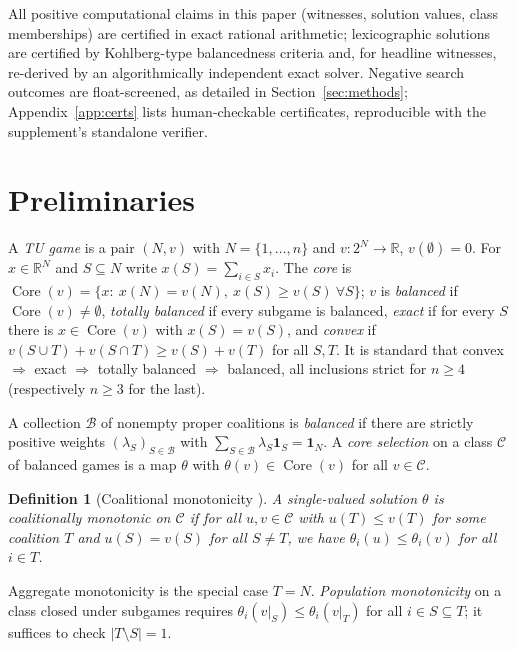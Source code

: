 \documentclass[11pt]{article}
\newtheorem{definition}[theorem]{Definition}
\newcommand{\R}{\mathbb{R}}
\newcommand{\core}{\operatorname{Core}}
\begin{document}
All positive computational claims in this paper (witnesses, solution
values, class memberships) are certified in exact rational arithmetic;
lexicographic solutions are certified by Kohlberg-type balancedness criteria
and, for headline witnesses, re-derived by an algorithmically independent
exact solver. Negative search outcomes are float-screened, as detailed in
Section~\ref{sec:methods}; Appendix~\ref{app:certs} lists human-checkable
certificates, reproducible with the supplement's standalone verifier.

\section{Preliminaries}\label{sec:prelim}

A \emph{TU game} is a pair $(N,v)$ with $N=\{1,\dots,n\}$ and
$v:2^N\to\R$, $v(\emptyset)=0$. For $x\in\R^N$ and $S\subseteq N$ write
$x(S)=\sum_{i\in S}x_i$. The \emph{core} is
$\core(v)=\{x:\ x(N)=v(N),\ x(S)\ge v(S)\ \forall S\}$; $v$ is
\emph{balanced} if $\core(v)\neq\emptyset$, \emph{totally balanced} if every
subgame is balanced, \emph{exact} \citep{Schmeidler72} if for every $S$ there is
$x\in\core(v)$ with $x(S)=v(S)$, and \emph{convex} if
$v(S\cup T)+v(S\cap T)\ge v(S)+v(T)$ for all $S,T$. It is standard that
convex $\Rightarrow$ exact $\Rightarrow$ totally balanced $\Rightarrow$
balanced, all inclusions strict for $n\ge 4$ (respectively $n\ge 3$ for the
last).

A collection $\mathcal{B}$ of nonempty proper coalitions is \emph{balanced}
if there are strictly positive weights $(\lambda_S)_{S\in\mathcal{B}}$ with
$\sum_{S\in\mathcal{B}}\lambda_S\mathbf{1}_S=\mathbf{1}_N$. A
\emph{core selection} on a class $\mathcal{C}$ of balanced games is a map
$\theta$ with $\theta(v)\in\core(v)$ for all $v\in\mathcal{C}$.

\begin{definition}[Coalitional monotonicity \citep{Young85,HousmanClark98}]
\label{def:cmon}
A single-valued solution $\theta$ is \emph{coalitionally monotonic} on
$\mathcal{C}$ if for all $u,v\in\mathcal{C}$ with $u(T)\le v(T)$ for some
coalition $T$ and $u(S)=v(S)$ for all $S\neq T$, we have
$\theta_i(u)\le\theta_i(v)$ for all $i\in T$.
\end{definition}

Aggregate monotonicity is the special case $T=N$. \emph{Population
monotonicity} on a class closed under subgames requires
$\theta_i(v|_S)\le\theta_i(v|_T)$ for all $i\in S\subseteq T$; it suffices to
check $|T\setminus S|=1$.
\end{document}

